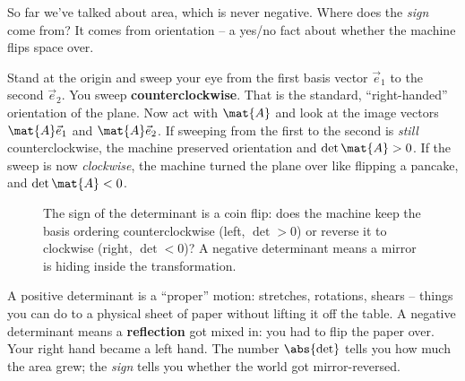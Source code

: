 So far we've talked about area, which is never negative. Where does the
\emph{sign} come from? It comes from orientation -- a yes/no fact about whether the
machine flips space over.

Stand at the origin and sweep your eye from the first basis vector $\vec e_1$ to
the second $\vec e_2$. You sweep \textbf{counterclockwise}. That is the standard,
``right-handed'' orientation of the plane. Now act with $\mat{A}$ and look at the
image vectors $\mat{A}\vec e_1$ and $\mat{A}\vec e_2$. If sweeping from the first
to the second is \emph{still} counterclockwise, the machine preserved orientation
and $\det\mat{A} > 0$. If the sweep is now \emph{clockwise}, the machine turned the
plane over like flipping a pancake, and $\det\mat{A} < 0$.

\begin{figure}[H]
\centering
{}
\caption{The sign of the determinant is a coin flip: does the machine keep the
basis ordering counterclockwise (left, $\det>0$) or reverse it to clockwise
(right, $\det<0$)? A negative determinant means a mirror is hiding inside the
transformation.}
\label{ch21:fig-orientation}
\end{figure}

\begin{intuitionbox}
A positive determinant is a ``proper'' motion: stretches, rotations, shears --
things you can do to a physical sheet of paper without lifting it off the table.
A negative determinant means a \textbf{reflection} got mixed in: you had to flip
the paper over. Your right hand became a left hand. The number $\abs{\det}$ tells
you how much the area grew; the \emph{sign} tells you whether the world got
mirror-reversed.
\end{intuitionbox}

